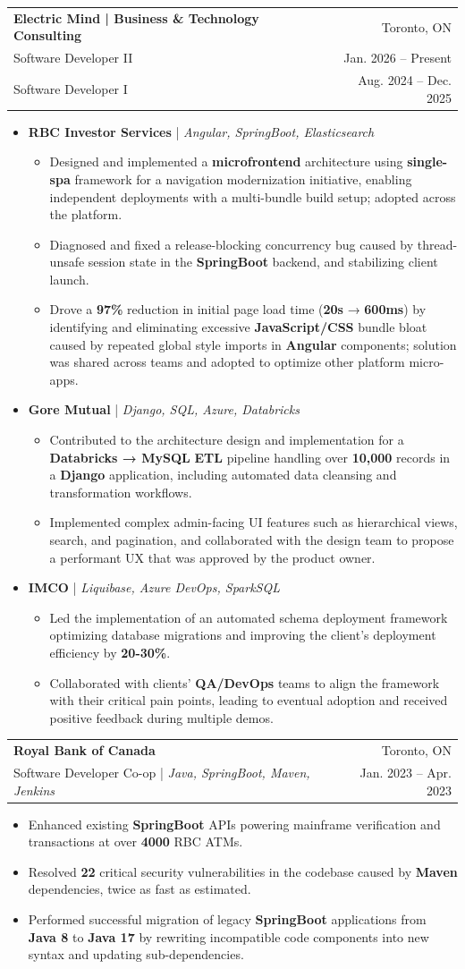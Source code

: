 \documentclass[letterpaper,10pt]{article}
\makeatletter
\newcommand{\itemspacing}{-2pt}
\newcommand{\subheadingspacing}{-2pt}
\newcommand{\baseItem}[2][\itemspacing]{
  \item\small{
    {#2 \vspace{#1}}
  }
}
\newcommand{\customSubheading}[6]{
  \vspace{-1pt}\item
  \begin{tabular*}{0.97\textwidth}{l@{\extracolsep{\fill}}r}
    #1 & #2 \\
    #3 | \textit{#4} & \small {#5} \\
    #6
  \end{tabular*}\vspace{\subheadingspacing}
}
\newcommand{\resumeItem}[1]{\baseItem{#1}}
\newcommand{\resumeSubheading}[5]{
  \customSubheading{\textbf{#1}}{#2}{#3}{#4}{#5}{}
}
\newcommand{\clientProjectHeader}[2]{
  \item\small{
    \textbf{#1} | \textit{#2} \vspace{-1pt}
  }
}
\newcommand{\clientProjectSubItem}[1]{
  \begin{itemize}[leftmargin=15pt, rightmargin=0pt, topsep=0pt, itemsep=1pt]
    \item\small{#1}
  \end{itemize}
  \vspace{-1pt}
}
\newcommand{\resumePromotionSubheading}[6]{
  \vspace{-1pt}\item
  \begin{tabular*}{0.97\textwidth}{l@{\extracolsep{\fill}}r}
    \textbf{#1} & #2 \\
    #3 & \small {#4} \\
    #5 & \small {#6} \\
  \end{tabular*}\vspace{\subheadingspacing}
}
\newcommand{\resumeItemListStart}{\begin{itemize}}
\newcommand{\resumeItemListEnd}{\end{itemize}\vspace{\subheadingspacing}}
\makeatother
\begin{document}
\resumePromotionSubheading
{Electric Mind | Business \& Technology Consulting}{Toronto, ON}
{Software Developer II}{Jan. 2026 -- Present}
{Software Developer I}{Aug. 2024 -- Dec. 2025}
\resumeItemListStart
\clientProjectHeader
{RBC Investor Services}
{Angular, SpringBoot, Elasticsearch}
\clientProjectSubItem
{Designed and implemented a \textbf{microfrontend} architecture using \textbf{single-spa} framework for a navigation modernization initiative, enabling independent deployments with a multi-bundle build setup; adopted across the platform.}
\clientProjectSubItem
{Diagnosed and fixed a release-blocking concurrency bug caused by thread-unsafe session state in the \textbf{SpringBoot} backend, and stabilizing client launch.}
\clientProjectSubItem
{Drove a \textbf{97\%} reduction in initial page load time (\textbf{20s} → \textbf{600ms}) by identifying and eliminating excessive \textbf{JavaScript/CSS} bundle bloat caused by repeated global style imports in \textbf{Angular} components; solution was shared across teams and adopted to optimize other platform micro-apps.}
\clientProjectHeader
{Gore Mutual}
{Django, SQL, Azure, Databricks}
\clientProjectSubItem
{Contributed to the architecture design and implementation for a \textbf{Databricks → MySQL} \textbf{ETL} pipeline handling over \textbf{10,000} records in a \textbf{Django} application, including automated data cleansing and transformation workflows.}
\clientProjectSubItem
{Implemented complex admin-facing UI features such as hierarchical views, search, and pagination, and collaborated with the design team to propose a performant UX that was approved by the product owner.}
\clientProjectHeader
{IMCO}
{Liquibase, Azure DevOps, SparkSQL}
\clientProjectSubItem
{Led the implementation of an automated schema deployment framework optimizing database migrations and improving the client's deployment efficiency by \textbf{20-30\%}.}
\clientProjectSubItem
{Collaborated with clients' \textbf{QA/DevOps} teams to align the framework with their critical pain points, leading to eventual adoption and received positive feedback during multiple demos.}
\resumeItemListEnd


\resumeSubheading
{Royal Bank of Canada}{Toronto, ON}
{Software Developer Co-op}{Java, SpringBoot, Maven, Jenkins}{Jan. 2023 -- Apr. 2023}
\resumeItemListStart
\resumeItem
{Enhanced existing \textbf{SpringBoot} APIs powering mainframe verification and transactions at over \textbf{4000} RBC ATMs.}
\resumeItem
{Resolved \textbf{22} critical security vulnerabilities in the codebase caused by \textbf{Maven} dependencies, twice as fast as estimated.}
\resumeItem
{Performed successful migration of legacy \textbf{SpringBoot} applications from \textbf{Java 8} to \textbf{Java 17} by rewriting incompatible code components into new syntax and updating sub-dependencies.}
\resumeItemListEnd
\end{document}
